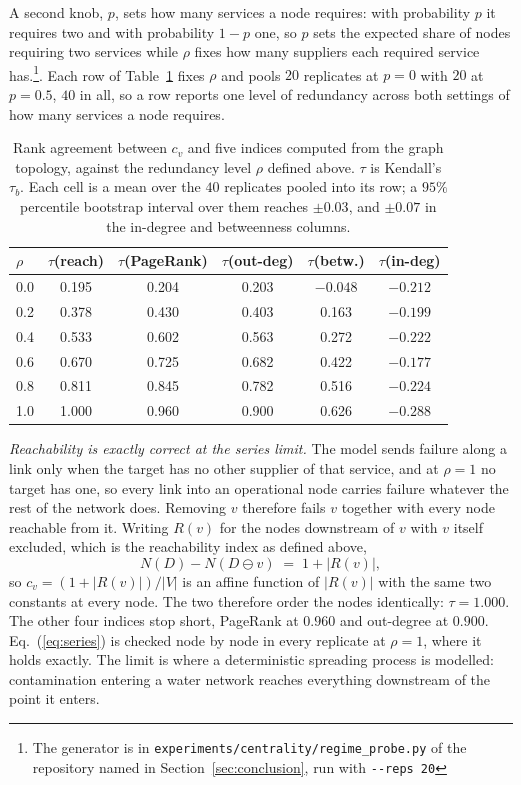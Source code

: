 \documentclass{svproc}
\begin{document}
A second knob, $p$, sets how many services a node requires: with probability $p$
it requires two and with probability $1 - p$ one, so $p$ sets the expected share of
nodes requiring two services while $\rho$ fixes how many suppliers each required
service has.\footnote{The generator is in
\texttt{experiments/centrality/regime\_probe.py} of the repository named in
Section~\ref{sec:conclusion}, run with \texttt{-{}-reps 20}}.
Each row of Table~\ref{tab:series} fixes $\rho$ and pools $20$ replicates at $p = 0$ with $20$ at $p = 0.5$, $40$ in all, so a
row reports one level of redundancy across both settings of how many services a
node requires. 
\begin{table}[!b]
\centering
\caption{Rank agreement between $c_v$ and five indices computed from the graph
topology, against the redundancy level $\rho$ defined above. $\tau$ is Kendall's
$\tau_b$. Each cell is a mean over the $40$ replicates pooled into its row; a $95\%$
percentile bootstrap interval over them reaches $\pm 0.03$, and $\pm 0.07$ in the
in-degree and betweenness columns.}
\label{tab:series}
{\small
\begin{tabular}{@{}lccccc@{}}
\toprule
$\rho$ & $\tau$(reach) & $\tau$(PageRank) & $\tau$(out-deg) & $\tau$(betw.) & $\tau$(in-deg) \\
\midrule
0.0 & 0.195 & 0.204 & 0.203 & $-0.048$ & $-0.212$ \\
0.2 & 0.378 & 0.430 & 0.403 & 0.163 & $-0.199$ \\
0.4 & 0.533 & 0.602 & 0.563 & 0.272 & $-0.222$ \\
0.6 & 0.670 & 0.725 & 0.682 & 0.422 & $-0.177$ \\
0.8 & 0.811 & 0.845 & 0.782 & 0.516 & $-0.224$ \\
1.0 & 1.000 & 0.960 & 0.900 & 0.626 & $-0.288$ \\
\bottomrule
\end{tabular}}
\end{table}

\emph{Reachability is exactly correct at the series limit.} The model sends failure
along a link only when the target has no other supplier of that service, and at
$\rho = 1$ no target has one, so every link into an operational node carries failure
whatever the rest of the network does. Removing $v$ therefore fails $v$ together
with every node reachable from it. Writing $R(v)$ for the nodes downstream of $v$
with $v$ itself excluded, which is the reachability index as defined above,
\begin{equation}
N(D) - N(D \ominus v) \;=\; 1 + |R(v)| ,
\label{eq:series}
\end{equation}
so $c_v = (1 + |R(v)|)/|V|$ is an affine function of $|R(v)|$ with the same two
constants at every node. The two therefore order the nodes identically: $\tau =
1.000$. The other four indices stop short, PageRank at
$0.960$ and out-degree at $0.900$. Eq.~(\ref{eq:series}) is checked node by node in
every replicate at $\rho = 1$, where it holds exactly. The limit is where a
deterministic spreading process is modelled: contamination entering a water network
reaches everything downstream of the point it enters.
\end{document}
